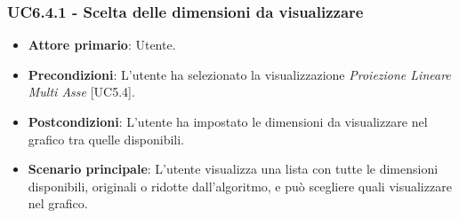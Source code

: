 \subsubsection{UC6.4.1 - Scelta delle dimensioni da visualizzare}
\begin{itemize}
	\item \textbf{Attore primario}: Utente.
	\item \textbf{Precondizioni}: L'utente ha selezionato la visualizzazione \textit{Proiezione Lineare Multi Asse} [UC5.4].
	\item \textbf{Postcondizioni}: L'utente ha impostato le dimensioni da visualizzare nel grafico tra quelle disponibili.
	
	\item \textbf{Scenario principale}: L'utente visualizza una lista con tutte le dimensioni disponibili, originali o ridotte dall'algoritmo, e può scegliere quali visualizzare nel grafico.
\end{itemize}